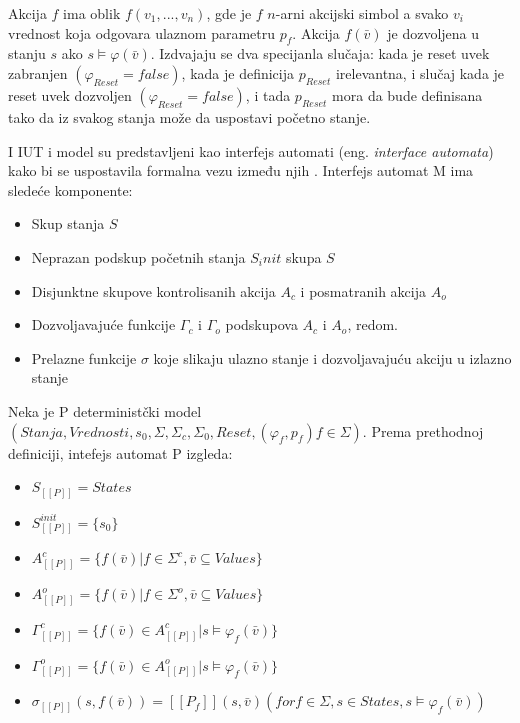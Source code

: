 \documentclass[a4paper]{article}
\theoremstyle{definition}
\begin{document}
{Akcija $f$ ima oblik $f(v_1,...,v_n)$, gde je $f$ $n$-arni akcijski simbol a svako $v_i$ vrednost koja odgovara ulaznom parametru $p_f$. Akcija $f(\bar{v})$ je dozvoljena u stanju $s$ ako $s \models \varphi(\bar{v})$. Izdvajaju se dva specijanla slučaja: kada je reset uvek zabranjen $(\varphi_{Reset} = false)$, kada je definicija $p_{Reset}$ irelevantna, i slučaj kada je reset uvek dozvoljen $(\varphi_{Reset} = false)$, i tada $p_{Reset}$ mora da bude definisana tako da iz svakog stanja može da uspostavi početno stanje.

I IUT i model su predstavljeni kao interfejs automati (eng. \emph{interface automata}) kako bi se uspostavila formalna vezu između njih \cite{interfaceAutomata}.
Interfejs automat M ima sledeće komponente:
\begin{itemize}
\item Skup stanja $S$
\item Neprazan podskup početnih stanja $S_init$ skupa $S$
\item Disjunktne skupove kontrolisanih akcija $A_c$ i posmatranih akcija $A_o$
\item Dozvoljavajuće funkcije $\Gamma_c$ i $\Gamma_o$ podskupova $A_c$ i $A_o$, redom.
\item Prelazne funkcije $\sigma$ koje slikaju ulazno stanje i dozvoljavajuću akciju u izlazno stanje
\end{itemize}

Neka je P deterministčki model $(Stanja, Vrednosti, s_0, \Sigma, \Sigma_c, \Sigma_0, Reset, (\varphi_f, p_f)f \in \Sigma)$. Prema prethodnoj definiciji, intefejs automat P izgleda:

\begin{itemize}
\item $S_{[[P]]} = States$
\item $S^{init}_{[[P]]} = \{s_0\}$
\item $A^c_{[[P]]} = \{ f(\bar{v}) | f \in \Sigma^c, \bar{v} \subseteq Values \}$ 
\item $A^o_{[[P]]} = \{ f(\bar{v}) | f \in \Sigma^o, \bar{v} \subseteq Values \}$
\item $\Gamma^c_{[[P]]} = \{ f(\bar{v}) \in A^c_{[[P]]} | s \models \varphi_f(\bar{v}) \}$ 
\item $\Gamma^o_{[[P]]} = \{ f(\bar{v}) \in A^o_{[[P]]} | s \models \varphi_f(\bar{v}) \}$
\item $\sigma_{[[P]]}(s, f(\bar{v})) = [[P_f]](s, \bar{v}) (for f \in \Sigma, s \in States, s \models \varphi_f(\bar{v}))$
\end{itemize}

}
\end{document}
